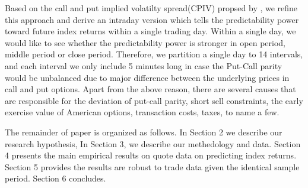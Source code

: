 Based on the call and put implied volatilty spread(CPIV) propsed by \textcite{cremers2010deviations}, we refine this approach and derive an intraday version which tells the predictability power toward future index returns within a single trading day. Within a single day, we would like to see whether the predictability power is stronger in open period, middle period or close period. Therefore, we partition a single day to 14 intervals, and each interval we only include 5 minutes long in case the Put-Call parity would be unbalanced due to major difference between the underlying prices in call and put options. Apart from the above reason, there are several causes that are responsible for the deviation of put-call parity, short sell constraints, the early exercise value of American options, transaction costs, taxes, to name a few. 

The remainder of paper is organized as follows. In Section 2 we describe our research hypothesis, In Section 3, we describe our methedology and data. Section 4 presents the main empirical results on quote data on predicting index returns. Section 5 provides the results are robust to trade data given the identical sample period. Section 6 concludes. 